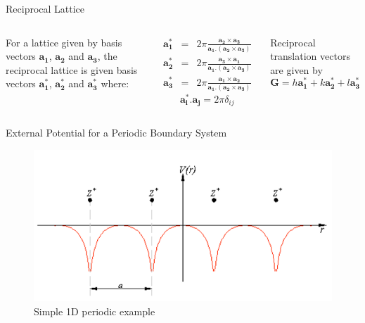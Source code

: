 \documentclass[aspectratio=169]{beamer}
\let \vec \mathbf
\begin{document}
    \begin{frame}{Reciprocal Lattice}

        \begin{columns}
            For a lattice given by basis vectors $\vec{a_1}$, $\vec{a_2}$ and $\vec{a_3}$, the reciprocal lattice is given basis vectors $\vec{a_1^*}$, $\vec{a_2^*}$ and $\vec{a_3^*}$ where:

            \begin{eqnarray*}
                \vec{a_1^*} & = & 2\pi\frac{\vec{a_2} \times \vec{a_3}}{\vec{a_1}.(\vec{a_2} \times \vec{a_3})}\\
                \vec{a_2^*} & = & 2\pi\frac{\vec{a_3} \times \vec{a_1}}{\vec{a_1}.(\vec{a_2} \times \vec{a_3})}\\
                \vec{a_3^*} & = & 2\pi\frac{\vec{a_1} \times \vec{a_2}}{\vec{a_1}.(\vec{a_2} \times \vec{a_3})}
            \end{eqnarray*}
            \begin{equation*}
                \vec{a_i^*}.\vec{a_j} = 2\pi \delta_{ij}
            \end{equation*}

            Reciprocal translation vectors are given by
            \begin{equation*}
                \vec{G} = h\vec{a_1^*} + k\vec{a_2^*} + l\vec{a_3^*}
            \end{equation*}
        \end{columns}

    \end{frame}

    \begin{frame}{External Potential for a Periodic Boundary System}

        \begin{figure}
            \centering
            \includegraphics[width=0.8\linewidth]{lectures/figures/7_periodic_potential.png}
            \caption{Simple 1D periodic example}
        \end{figure}

    \end{frame}
\end{document}
